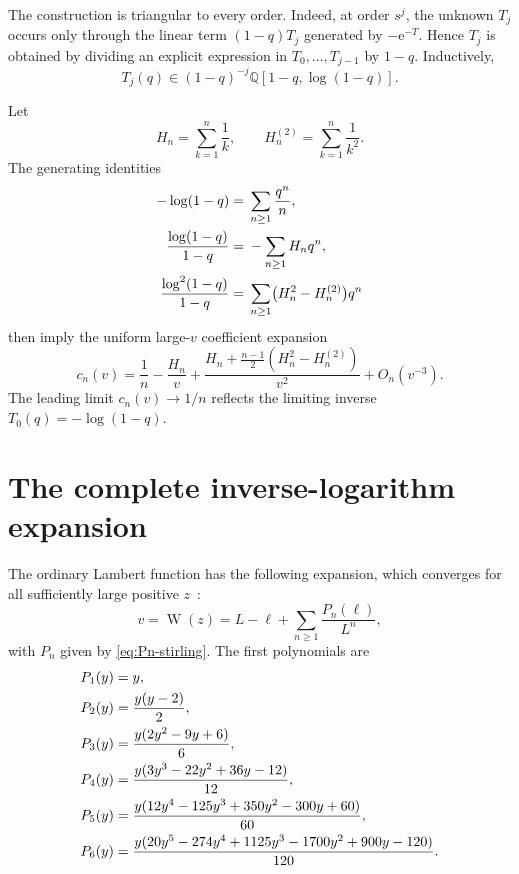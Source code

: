 \documentclass[11pt,oneside]{article}
\theoremstyle{plain}
\theoremstyle{definition}
\theoremstyle{remark}
\newcommand{\W}{\operatorname{W}}
\newcommand{\e}{\mathrm{e}}
\newcommand{\Q}{\mathbb{Q}}
\begin{document}
The construction is triangular to every order.  Indeed, at order \(s^j\), the
unknown \(T_j\) occurs only through the linear term \((1-q)T_j\) generated by
\(-\e^{-T}\).  Hence \(T_j\) is obtained by dividing an explicit expression in
\(T_0,\ldots,T_{j-1}\) by \(1-q\).  Inductively,
\begin{equation}
 T_j(q)\in(1-q)^{-j}\Q[1-q,\log(1-q)].
 \label{eq:Tj-class}
\end{equation}

Let
\begin{equation}
 H_n=\sum_{k=1}^{n}\frac1k,
 \qquad
 H_n^{(2)}=\sum_{k=1}^{n}\frac1{k^2}.
 \label{eq:harmonic}
\end{equation}
The generating identities
\begin{align}
 -\log(1-q)={}&\sum_{n\ge1}\frac{q^n}{n},\notag\\
 \frac{\log(1-q)}{1-q}={}&-\sum_{n\ge1}H_nq^n,\notag\\
 \frac{\log^2(1-q)}{1-q}={}&
 \sum_{n\ge1}\bigl(H_n^2-H_n^{(2)}\bigr)q^n
 \label{eq:harmonic-generating}
\end{align}
then imply the uniform large-\(v\) coefficient expansion
\begin{equation}
 \boxed{
 c_n(v)=\frac1n-\frac{H_n}{v}
 +\frac{H_n+\frac{n-1}{2}
   (H_n^2-H_n^{(2)})}{v^2}
 +O_n(v^{-3}).}
 \label{eq:cn-harmonic}
\end{equation}
The leading limit \(c_n(v)\to1/n\) reflects the limiting inverse
\(T_0(q)=-\log(1-q)\).

\section{The complete inverse-logarithm expansion}
\label{sec:pure-log}

The ordinary Lambert function has the following expansion, which converges
for all sufficiently large positive \(z\)~\cite{CorlessEtAl1996,DLMF413}:
\begin{equation}
 v=\W(z)=L-\ell+\sum_{n\ge1}\frac{P_n(\ell)}{L^n},
 \label{eq:W-log-expansion}
\end{equation}
with \(P_n\) given by \eqref{eq:Pn-stirling}.  The first polynomials are
\begin{align}
 P_1(y)={}&y,\notag\\
 P_2(y)={}&\frac{y(y-2)}2,\notag\\
 P_3(y)={}&\frac{y(2y^2-9y+6)}6,\notag\\
 P_4(y)={}&\frac{y(3y^3-22y^2+36y-12)}{12},\notag\\
 P_5(y)={}&\frac{y(12y^4-125y^3+350y^2-300y+60)}{60},\notag\\
 P_6(y)={}&\frac{y(20y^5-274y^4+1125y^3-1700y^2+900y-120)}{120}.
 \label{eq:P1-P6}
\end{align}
\end{document}
